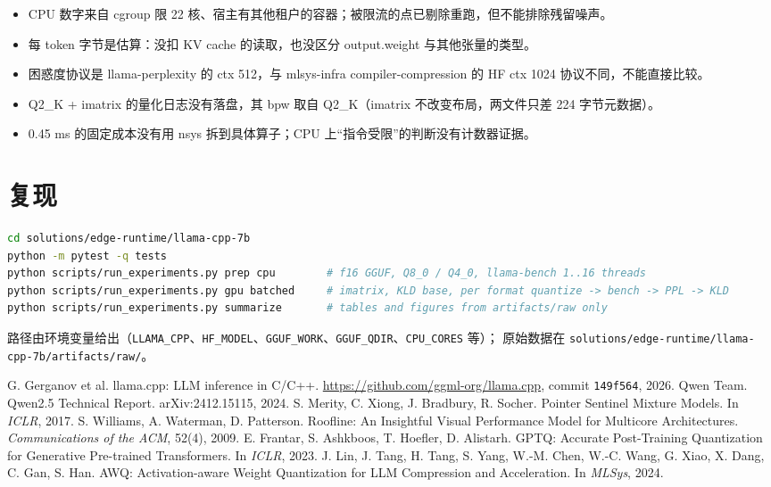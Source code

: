 \documentclass[11pt,a4paper]{ctexart}
\begin{document}
\begin{caveatbox}
\begin{itemize}
  \item CPU 数字来自 cgroup 限 22 核、宿主有其他租户的容器；被限流的点已剔除重跑，但不能排除残留噪声。
  \item 每 token 字节是估算：没扣 KV cache 的读取，也没区分 output.weight 与其他张量的类型。
  \item 困惑度协议是 llama-perplexity 的 ctx 512，与 mlsys-infra compiler-compression 的 HF ctx 1024 协议不同，不能直接比较。
  \item Q2\_K + imatrix 的量化日志没有落盘，其 bpw 取自 Q2\_K（imatrix 不改变布局，两文件只差 224 字节元数据）。
  \item 0.45 ms 的固定成本没有用 nsys 拆到具体算子；CPU 上“指令受限”的判断没有计数器证据。
\end{itemize}
\end{caveatbox}

\section{复现}

\begin{lstlisting}[language=bash]
cd solutions/edge-runtime/llama-cpp-7b
python -m pytest -q tests
python scripts/run_experiments.py prep cpu        # f16 GGUF, Q8_0 / Q4_0, llama-bench 1..16 threads
python scripts/run_experiments.py gpu batched     # imatrix, KLD base, per format quantize -> bench -> PPL -> KLD
python scripts/run_experiments.py summarize       # tables and figures from artifacts/raw only
\end{lstlisting}

路径由环境变量给出（\texttt{LLAMA\_CPP}、\texttt{HF\_MODEL}、\texttt{GGUF\_WORK}、\texttt{GGUF\_QDIR}、\texttt{CPU\_CORES} 等）；
原始数据在 \nolinkurl{solutions/edge-runtime/llama-cpp-7b/artifacts/raw/}。

\begin{thebibliography}{99}
 G. Gerganov et al. llama.cpp: LLM inference in C/C++. \url{https://github.com/ggml-org/llama.cpp}, commit \texttt{149f564}, 2026.
 Qwen Team. Qwen2.5 Technical Report. arXiv:2412.15115, 2024.
 S. Merity, C. Xiong, J. Bradbury, R. Socher. Pointer Sentinel Mixture Models. In \emph{ICLR}, 2017.
 S. Williams, A. Waterman, D. Patterson. Roofline: An Insightful Visual Performance Model for Multicore Architectures. \emph{Communications of the ACM}, 52(4), 2009.
 E. Frantar, S. Ashkboos, T. Hoefler, D. Alistarh. GPTQ: Accurate Post-Training Quantization for Generative Pre-trained Transformers. In \emph{ICLR}, 2023.
 J. Lin, J. Tang, H. Tang, S. Yang, W.-M. Chen, W.-C. Wang, G. Xiao, X. Dang, C. Gan, S. Han. AWQ: Activation-aware Weight Quantization for LLM Compression and Acceleration. In \emph{MLSys}, 2024.
\end{thebibliography}
\end{document}
